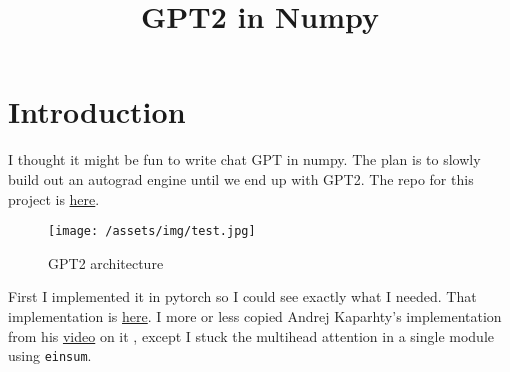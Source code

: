 \documentclass[11pt]{article}
\title{GPT2 in Numpy}
\begin{document}
\section{Introduction}
I thought it might be fun to write chat GPT in numpy. 
The plan is to slowly build out an autograd engine until we end up with GPT2.
The repo for this project is \href{https://github.com/sammy-snipes/numpy-GPT2}{here}. 

\begin{figure}[H]
  \begin{center}
    \texttt{[image: /assets/img/test.jpg]}
  \end{center}
  \caption{GPT2 architecture}\label{fig:}
\end{figure}

First I implemented it in pytorch so I could see exactly what I needed. That implementation is 
\href{https://github.com/sammy-snipes/numpy-GPT2/blob/main/numpyGPT/pytorch_reference.py}{here}.
I more or less copied Andrej Kaparhty's implementation from his 
\href{https://github.com/karpathy/ng-video-lecture}{video} on it
, except I stuck the multihead attention in a single 
module using \texttt{einsum}. 
\end{document}
